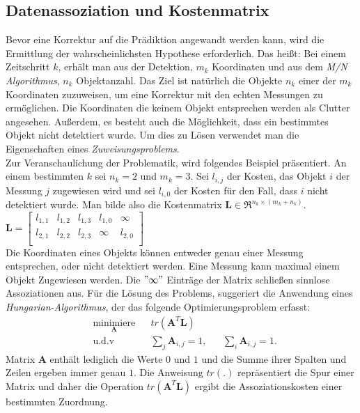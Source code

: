 \documentclass[10pt,a4paper]{article}
\begin{document}
\subsection{Datenassoziation und Kostenmatrix}
Bevor eine Korrektur auf die Prädiktion angewandt werden kann, wird die Ermittlung der wahrscheinlichsten Hypothese erforderlich. Das heißt: Bei einem Zeitschritt $k$, erhält man aus der Detektion, $m_k$ Koordinaten und aus dem \textit{M/N Algorithmus}, $n_k$ Objektanzahl. Das Ziel ist natürlich die Objekte $n_k$ einer der $m_k$ Koordinaten zuzuweisen, um eine Korrektur mit den echten Messungen zu ermöglichen. Die Koordinaten die keinem Objekt entsprechen werden als Clutter angesehen. Außerdem, es besteht auch die Möglichkeit, dass ein bestimmtes Objekt nicht detektiert wurde. Um dies zu Lösen verwendet man die Eigenschaften eines \textit{Zuweisungsproblems}.\\
Zur Veranschaulichung der Problematik, wird folgendes Beispiel präsentiert. An einem bestimmten $k$ sei $n_k = 2$ und $m_k = 3$. Sei $l_{i,j}$ der Kosten, das Objekt $i$ der Messung $j$ zugewiesen wird und sei $l_{i,0}$ der Kosten für den Fall, dass $i$ nicht detektiert wurde. Man bilde also die Kostenmatrix $\textbf{L} \in \Re^{n_k\times (m_k +n_k) }$.\\
\newline
$\textbf{L} = \begin{bmatrix}
l_{1,1} & l_{1,2} & l_{1,3} & l_{1,0}& \infty \\
l_{2,1} & l_{2,2} & l_{2,3} &\infty & l_{2,0} \\
\end{bmatrix}$\\
\newline
Die Koordinaten eines Objekts können entweder genau einer Messung entsprechen, oder nicht detektiert werden. Eine Messung kann maximal einem Objekt Zugewiesen werden. Die $"\infty"$
Einträge der Matrix schließen sinnlose Assoziationen aus. Für die Lösung des Problems, suggeriert \cite{hungarian} die Anwendung eines \textit{Hungarian-Algorithmus}, der das folgende Optimierungsproblem erfasst:
\begin{equation}
\begin{aligned}
& \underset{\textbf{A}}{\text{minimiere}}
& & tr(\textbf{A}^T\textbf{L}) \\
& \text{u.d.v}
& & \sum_j \textbf{A}_{i,j} = 1,
& & \sum_i \textbf{A}_{i,j} = 1.
\end{aligned}
\end{equation}
Matrix \textbf{A} enthält lediglich die Werte $0$ und $1$ und die Summe ihrer Spalten und Zeilen ergeben immer genau $1$. Die Anweisung $tr(.)$ repräsentiert die Spur einer Matrix und daher die Operation $tr(\textbf{A}^T\textbf{L})$ ergibt die Assoziationskosten einer bestimmten Zuordnung. \\
\end{document}
